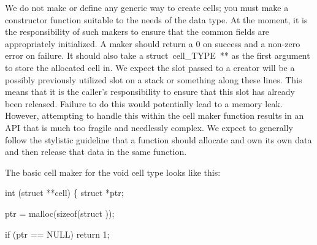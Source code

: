 \documentclass{article}%
\begin{document}
\nwenddocs{}\endmoddef\nwstartdeflinemarkup{}\nwenddeflinemarkup
{}
\eatline
{}\nwendcode{}\nwdocspar
We do not make or define any generic way
to create cells; 
you must make a constructor function suitable
to the needs of the data type.
At the moment, it is the responsibility of such makers
to ensure that the common fields are 
appropriately initialized.
A maker should return a {\Tt{}0\nwendquote} on success
and a non-zero error on failure.
It should also take a {\Tt{}struct\ cell{\_}TYPE\ **\nwendquote}
as the first argument to store the allocated cell in.
We expect the slot passed to a creator
will be a possibly previously utilized slot
on a stack or something along these lines.
This means that it is the caller's responsibility
to ensure that this slot has already been released.
Failure to do this would potentially lead to a memory leak.
However, attempting to handle this within the cell maker function
results in an API that is much too fragile and needlessly complex.
We expect to generally follow the stylistic guideline 
that a function should allocate and own its own data
and then release that data in the same function.

The basic cell maker for the {\Tt{}void\nwendquote} cell type looks like this:

\nwenddocs{}\endmoddef\nwstartdeflinemarkup{}\nwenddeflinemarkup
{} int
(struct  **cell)
\{
        struct  *ptr;

        ptr = malloc(sizeof(struct ));

        if (ptr == NULL)
                return 1;
\end{document}
